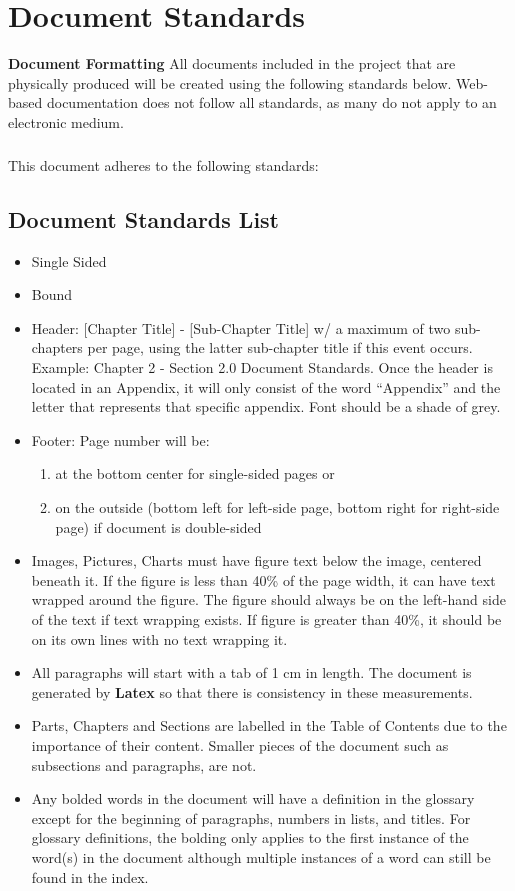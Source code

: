 \documentclass[letterpaper,12pt]{report}
\begin{document}
\chapter{Document Standards}
\textbf{Document Formatting} All documents included in the project that are physically produced will be created using the following standards below. Web-based documentation does not follow all standards, as many do not apply to an electronic medium.
\paragraph*{}This document adheres to the following standards:
\section{Document Standards List}
\begin{itemize}
 \item Single Sided
 \item Bound
 \item Header: [Chapter Title] - [Sub-Chapter Title] w/ a maximum of two sub-chapters per page, using the latter sub-chapter title if this event occurs. Example: Chapter 2 - Section 2.0 Document Standards. Once the header is located in an Appendix, it will only consist of the word ``Appendix'' and the letter that represents that specific appendix.\newline
 \textcolor{custom}{Font should be a shade of grey.}
 \item Footer: Page number will be:
	\begin{enumerate}
	\item at the bottom center for single-sided pages or
	\item on the outside (bottom left for left-side page, bottom right for right-side page) if document is double-sided
	\end{enumerate}
 \item Images, Pictures, Charts must have figure text below the image, centered beneath it.
	If the figure is less than 40\% of the page width, it can have text wrapped around the figure.
	The figure should always be on the left-hand side of the text if text wrapping exists. 
	If figure is greater than 40\%, it should be on its own lines with no text wrapping it.
 \item All paragraphs will start with a tab of 1 cm in length. The document is generated by \textbf{Latex} so that there is consistency in these measurements.
 \item Parts, Chapters and Sections are labelled in the Table of Contents due to the importance of their content. Smaller pieces of the document such as subsections and paragraphs, are not.
 \item Any bolded words in the document will have a definition in the glossary except for the beginning of paragraphs, numbers in lists, and titles. For glossary definitions, the bolding only applies to the first instance of the word(s) in the document although multiple instances of a word can still be found in the index.
\end{itemize}
\end{document}
